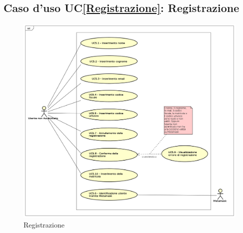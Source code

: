 \subsection{Caso d'uso UC\ref{Registrazione}: Registrazione }
\begin{figure} [H]
	\centering
	\includegraphics[scale=0.45]{./img/UseCaseDiagram05.png}
	\caption{Registrazione }\label{}
\end{figure}
